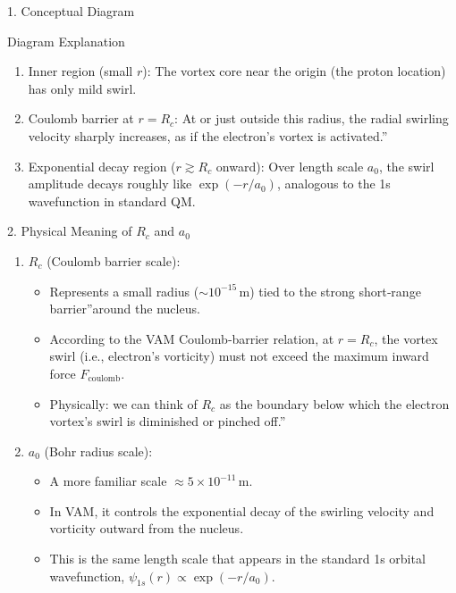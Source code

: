 1. Conceptual Diagram

Diagram Explanation

\begin{enumerate}
    \item Inner region (small \(r\)): The vortex core near the origin (the proton location) has only mild swirl.
    \item Coulomb barrier at \(r = R_c\): At or just outside this radius, the radial swirling velocity sharply increases, as if the electron's vortex is \grqq activated.\textquotedblright
    \item Exponential decay region (\(r \gtrsim R_c\) onward): Over length scale \(a_0\), the swirl amplitude decays roughly like \(\exp(-r/a_0)\), analogous to the 1s wavefunction in standard QM.
\end{enumerate}

2. Physical Meaning of \(R_c\) and \(a_0\)

\begin{enumerate}
\item \(R_c\) (Coulomb barrier scale):

    \begin{itemize}
    \item Represents a small radius (\(\sim 10^{-15}\,\mathrm{m}\)) tied to the strong short‐range \grqq barrier\textquotedblright around the nucleus.
    \item According to the VAM Coulomb‐barrier relation, at \(r = R_c\), the vortex swirl (i.e., electron's vorticity) must not exceed the maximum inward force \(F_{\mathrm{coulomb}}\).
    \item Physically: we can think of \(R_c\) as the boundary below which the electron vortex's swirl is diminished or \grqq pinched off.\textquotedblright
    \end{itemize}

\item \(a_0\) (Bohr radius scale):

    \begin{itemize}
    \item A more familiar scale \(\approx 5 \times 10^{-11}\,\mathrm{m}\).
    \item In VAM, it controls the exponential decay of the swirling velocity and vorticity outward from the nucleus.
    \item This is the same length scale that appears in the standard 1s orbital wavefunction, \(\psi_{1s}(r) \propto \exp(-r/a_0)\).
    \end{itemize}
\end{enumerate}

